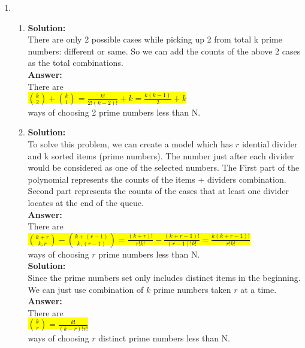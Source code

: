 \documentclass{article}
\begin{document}
\thispagestyle{fancy} %

\newcommand{\myansw}{\textbf{Answer:}\\}

\newcommand{\mysolu}{\textbf{Solution:}\\}

\begin{enumerate}


	\item 
	
	\begin{enumerate}
		\item
		\mysolu
		There are only 2 possible cases while picking up 2 from total k prime numbers: different or same. So we can add the counts of the above 2 cases as the total combinations.\\
		\myansw
		There are \\
		\colorbox{yellow}{
			${ {k \choose 2} + {k \choose 1} = \frac{k!}{2!(k-2)!}+k=\frac{k(k-1)}{2}+k}$
		}\\
		ways of choosing 2 prime numbers less than N.\\
			
		\item
		\mysolu
		To solve this problem, we can create a model which has ${r}$ idential divider and k sorted items (prime numbers). The number just after each divider would be considered as one of the selected numbers. The  First part of the polynomial represents the counts of the items + dividers combination. Second part represents the counts of the cases that at least one divider locates at the end of the queue.\\
		\myansw
		There are\\
		\colorbox{yellow}{
			${  {k+r \choose k,r}  - {k+(r-1) \choose k, (r-1)}= \frac{(k+r)!}{r!k!}-\frac{(k+r-1)!}{(r-1)!k!} = \frac{k(k+r-1)!}{r!k!}}$
		}\\
		ways of choosing ${r}$ prime numbers less than N.\\
		
		\mysolu
		Since the prime numbers set only includes distinct items in the beginning. We can just use combination of ${k}$ prime numbers taken ${r}$ at a time.\\
				\myansw
		There are\\
		\colorbox{yellow}{
			${{k \choose r}=\frac{k!}{(k-r)!r!}}$
		}\\
		ways of choosing ${r}$ distinct prime numbers less than N.\\


\end{enumerate}
\end{enumerate}
\end{document}
